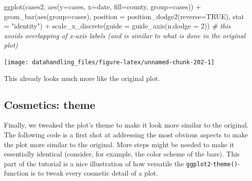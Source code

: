 \documentclass[
  12pt,
]{style/krantz}
\newenvironment{Shaded}{\begin{snugshade}}{\end{snugshade}}
\newcommand{\AttributeTok}[1]{\textcolor[rgb]{0.77,0.63,0.00}{#1}}
\newcommand{\CommentTok}[1]{\textcolor[rgb]{0.56,0.35,0.01}{\textit{#1}}}
\newcommand{\ConstantTok}[1]{\textcolor[rgb]{0.00,0.00,0.00}{#1}}
\newcommand{\DecValTok}[1]{\textcolor[rgb]{0.00,0.00,0.81}{#1}}
\newcommand{\FunctionTok}[1]{\textcolor[rgb]{0.00,0.00,0.00}{#1}}
\newcommand{\NormalTok}[1]{#1}
\newcommand{\SpecialCharTok}[1]{\textcolor[rgb]{0.00,0.00,0.00}{#1}}
\newcommand{\StringTok}[1]{\textcolor[rgb]{0.31,0.60,0.02}{#1}}
\begin{document}
\begin{Shaded}
\begin{Highlighting}[]
\FunctionTok{ggplot}\NormalTok{(cases2, }\FunctionTok{aes}\NormalTok{(}\AttributeTok{y=}\NormalTok{cases, }\AttributeTok{x=}\NormalTok{date, }\AttributeTok{fill=}\NormalTok{county, }\AttributeTok{group=}\NormalTok{cases)) }\SpecialCharTok{+}
  \FunctionTok{geom\_bar}\NormalTok{(}\FunctionTok{aes}\NormalTok{(}\AttributeTok{group=}\NormalTok{cases), }\AttributeTok{position =} \FunctionTok{position\_dodge2}\NormalTok{(}\AttributeTok{reverse=}\ConstantTok{TRUE}\NormalTok{), }\AttributeTok{stat =} \StringTok{"identity"}\NormalTok{) }\SpecialCharTok{+}
    \FunctionTok{scale\_x\_discrete}\NormalTok{(}\AttributeTok{guide =} \FunctionTok{guide\_axis}\NormalTok{(}\AttributeTok{n.dodge =} \DecValTok{2}\NormalTok{))  }\CommentTok{\# this avoids overlapping of x{-}axis labels (and is similar to what is done in the original plot)}
\end{Highlighting}
\end{Shaded}

\texttt{[image: datahandling\_files/figure-latex/unnamed-chunk-202-1]}

This already looks much more like the original plot.

\hypertarget{cosmetics-theme}{%
\subsection{Cosmetics: theme}\label{cosmetics-theme}}

Finally, we tweaked the plot's theme to make it look more similar to the original. The following code is a first shot at addressing the most obvious aspects to make the plot more similar to the original. More steps might be needed to make it essentially identical (consider, for example, the color scheme of the bars). This part of the tutorial is a nice illustration of how versatile the \texttt{ggplot2}-\texttt{theme()}-function is to tweak every cosmetic detail of a plot.
\end{document}
